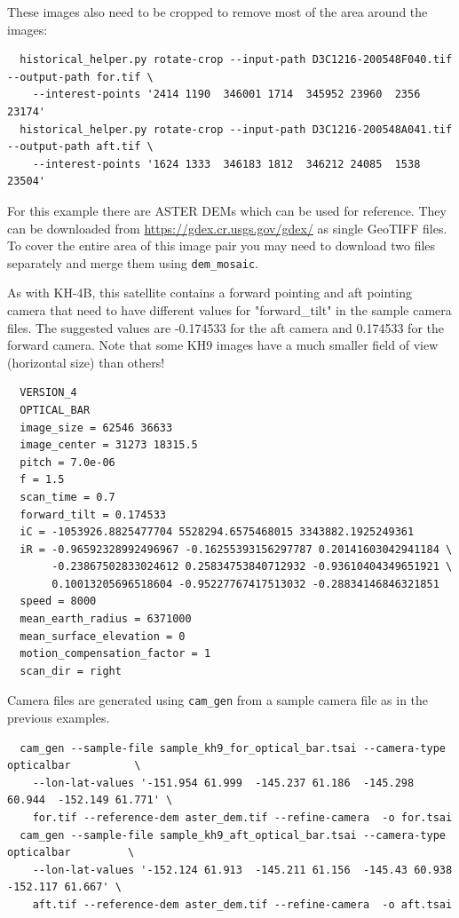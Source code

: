 These images also need to be cropped to remove most of the area around the images:

\begin{verbatim}
  historical_helper.py rotate-crop --input-path D3C1216-200548F040.tif --output-path for.tif \
    --interest-points '2414 1190  346001 1714  345952 23960  2356 23174'
  historical_helper.py rotate-crop --input-path D3C1216-200548A041.tif --output-path aft.tif \
    --interest-points '1624 1333  346183 1812  346212 24085  1538 23504'
\end{verbatim}

For this example there are ASTER DEMs which can be used for reference.  They can be downloaded from
\url{https://gdex.cr.usgs.gov/gdex/} as single GeoTIFF files.  To cover the entire area of this
image pair you may need to download two files separately and merge them using \texttt{dem\_mosaic}.

As with KH-4B, this satellite contains a forward pointing and aft pointing camera that need to have
different values for "forward\_tilt" in the sample camera files.  The suggested values are -0.174533
for the aft camera and 0.174533 for the forward camera.  Note that some KH9 images have a much smaller
field of view (horizontal size) than others!

\begin{verbatim}
  VERSION_4
  OPTICAL_BAR
  image_size = 62546 36633
  image_center = 31273 18315.5
  pitch = 7.0e-06
  f = 1.5
  scan_time = 0.7
  forward_tilt = 0.174533
  iC = -1053926.8825477704 5528294.6575468015 3343882.1925249361
  iR = -0.96592328992496967 -0.16255393156297787 0.20141603042941184 \
       -0.23867502833024612 0.25834753840712932 -0.93610404349651921 \
       0.10013205696518604 -0.95227767417513032 -0.28834146846321851
  speed = 8000
  mean_earth_radius = 6371000
  mean_surface_elevation = 0
  motion_compensation_factor = 1
  scan_dir = right
\end{verbatim}

Camera files are generated using \texttt{cam\_gen} from a sample camera file as in the previous examples.

\begin{verbatim}
  cam_gen --sample-file sample_kh9_for_optical_bar.tsai --camera-type opticalbar          \
    --lon-lat-values '-151.954 61.999  -145.237 61.186  -145.298 60.944  -152.149 61.771' \
    for.tif --reference-dem aster_dem.tif --refine-camera  -o for.tsai
  cam_gen --sample-file sample_kh9_aft_optical_bar.tsai --camera-type opticalbar         \
    --lon-lat-values '-152.124 61.913  -145.211 61.156  -145.43 60.938  -152.117 61.667' \
    aft.tif --reference-dem aster_dem.tif --refine-camera  -o aft.tsai
\end{verbatim}

